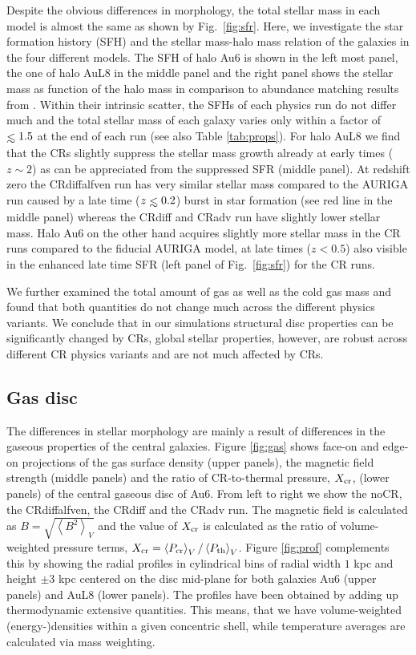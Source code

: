 \documentclass[useAMS,usenatbib]{mnras}
\def\lesssim{\mathrel{\hbox{\rlap{\hbox{\lower4pt\hbox{$\sim$}}}\hbox{$<$}}}}
\begin{document}
Despite the obvious differences in morphology, the total stellar mass in each model is almost the same as shown by Fig.\ \ref{fig:sfr}. Here, we investigate the star formation history (SFH) and the stellar mass-halo mass relation of the galaxies in the four different models. The SFH of halo Au6 is shown in the left most panel, the one of halo AuL8 in the middle panel and the right panel shows the stellar mass as function of the halo mass in comparison to abundance matching results from \citet{Moster2013}. Within their intrinsic scatter, the SFHs of each physics run do not differ much and the total stellar mass of each galaxy varies only within a factor of $\lesssim1.5$ at the end of each run (see also Table \ref{tab:props}). For halo AuL8 we find that the CRs slightly suppress the stellar mass growth already at early times ($z\sim2$) as can be appreciated from the suppressed SFR (middle panel). At redshift zero the CRdiffalfven run has very similar stellar mass compared to the AURIGA run caused by a late time ($z\lesssim0.2$) burst in star formation (see red line in the middle panel) whereas the CRdiff and CRadv run have slightly lower stellar mass. Halo Au6 on the other hand acquires slightly more stellar mass in the CR runs compared to the fiducial AURIGA model, at late times ($z<0.5$) also visible in the enhanced late time SFR (left panel of Fig.\ \ref{fig:sfr}) for the CR runs. 

We further examined the total amount of gas as well as the cold gas mass and found that both quantities do not change much across the different physics variants. We conclude that in our simulations structural disc properties can be significantly changed by CRs, global stellar properties, however, are robust across different CR physics variants and are not much affected by CRs.

\subsection{Gas disc}
\label{subsec:gasdisc}
The differences in stellar morphology are mainly a result of differences in the gaseous properties of the central galaxies. Figure \ref{fig:gas} shows face-on and edge-on projections of the gas surface density (upper panels), the magnetic field strength (middle panels) and the ratio of CR-to-thermal pressure, $X_{\rm cr}$, (lower panels) of the central gaseous disc of Au6. From left to right we show the noCR, the CRdiffalfven, the CRdiff and the CRadv run. The magnetic field is calculated as $B=\sqrt{\left<B^2\right>_V}$ and the value of $X_{\rm cr}$ is calculated as the ratio of volume-weighted pressure terms, $X_{\rm cr} = \left<P_{\rm cr}\right>_V / \left<P_{\rm th}\right>_V$. Figure \ref{fig:prof} complements this by showing the radial profiles in cylindrical bins of radial width $1$ kpc and height $\pm3$ kpc centered on the disc mid-plane for both galaxies Au6 (upper panels) and AuL8 (lower panels). The profiles have been obtained by adding up thermodynamic extensive quantities. This means, that we have volume-weighted \mbox{(energy-)}densities within a given concentric shell, while temperature averages are calculated via mass weighting.
\end{document}
